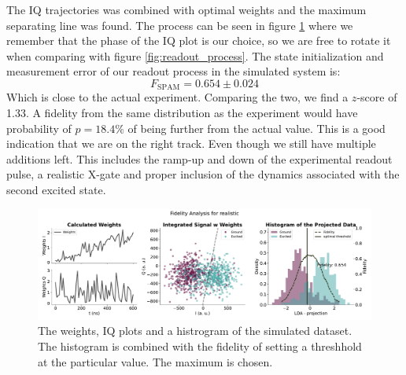 The IQ trajectories was combined with optimal weights and the maximum separating line was found. The process can be seen in figure \ref{fig:simulation_readout} where we remember that the phase of the IQ plot is our choice, so we are free to rotate it when comparing with figure \ref{fig:readout_process}. The state initialization and measurement error of our readout process in the simulated system is:
\begin{equation}
    F_{\text{SPAM}} = 0.654 \pm 0.024
\end{equation}
Which is close to the actual experiment. Comparing the two, we find a $z$-score of 1.33. A fidelity from the same distribution as the experiment would have probability of  $p = 18.4 \%$ of being further from the actual value. This is a good indication that we are on the right track. Even though we still have multiple additions left. This includes the ramp-up and down of the experimental readout pulse, a realistic X-gate and proper inclusion of the dynamics associated with the second excited state. 
\begin{figure}[t]
    \centering
    \includegraphics[]{Simulations/budgets/figures/realistic_sme.pdf}
    \caption{The weights, IQ plots and a histrogram of the simulated dataset. The histogram is combined with the fidelity of setting a threshhold at the particular value. The maximum is chosen.}
    \label{fig:simulation_readout}
\end{figure}
